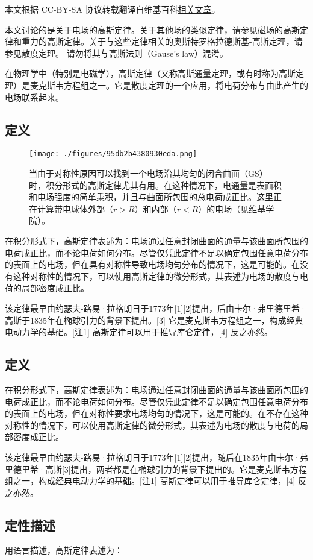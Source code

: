 
本文根据 CC-BY-SA 协议转载翻译自维基百科\href{https://en.wikipedia.org/wiki/Conservation_of_energy}{相关文章}。

本文讨论的是关于电场的高斯定律。关于其他场的类似定律，请参见磁场的高斯定律和重力的高斯定律。关于与这些定律相关的奥斯特罗格拉德斯基-高斯定理，请参见散度定理。  
请勿将其与高斯法则（Gause's law）混淆。

在物理学中（特别是电磁学），高斯定律（又称高斯通量定理，或有时称为高斯定理）是麦克斯韦方程组之一。它是散度定理的一个应用，将电荷分布与由此产生的电场联系起来。
\subsection{定义}
\begin{figure}[ht]
\centering
\texttt{[image: ./figures/95db2b4380930eda.png]}
\caption{当由于对称性原因可以找到一个电场沿其均匀的闭合曲面（GS）时，积分形式的高斯定律尤其有用。在这种情况下，电通量是表面积和电场强度的简单乘积，并且与曲面所包围的总电荷成正比。这里正在计算带电球体外部（\( r > R \)）和内部（\( r < R \)）的电场（见维基学院）。} \label{fig_GSDL_1}
\end{figure}
在积分形式下，高斯定律表述为：电场通过任意封闭曲面的通量与该曲面所包围的电荷成正比，而不论电荷如何分布。尽管仅凭此定律不足以确定包围任意电荷分布的表面上的电场，但在具有对称性导致电场均匀分布的情况下，这是可能的。在没有这种对称性的情况下，可以使用高斯定律的微分形式，其表述为电场的散度与电荷的局部密度成正比。

该定律最早由约瑟夫-路易·拉格朗日于1773年[1][2]提出，后由卡尔·弗里德里希·高斯于1835年在椭球引力的背景下提出。[3] 它是麦克斯韦方程组之一，构成经典电动力学的基础。[注1] 高斯定律可以用于推导库仑定律，[4] 反之亦然。
\subsection{定义}
在积分形式下，高斯定律表述为：电场通过任意封闭曲面的通量与该曲面所包围的电荷成正比，而不论电荷如何分布。尽管仅凭此定律不足以确定包围任意电荷分布的表面上的电场，但在对称性要求电场均匀的情况下，这是可能的。在不存在这种对称性的情况下，可以使用高斯定律的微分形式，其表述为电场的散度与电荷的局部密度成正比。

该定律最早由约瑟夫-路易·拉格朗日于1773年[1][2]提出，随后在1835年由卡尔·弗里德里希·高斯[3]提出，两者都是在椭球引力的背景下提出的。它是麦克斯韦方程组之一，构成经典电动力学的基础。[注1] 高斯定律可以用于推导库仑定律，[4] 反之亦然。
\subsection{定性描述}
用语言描述，高斯定律表述为：


